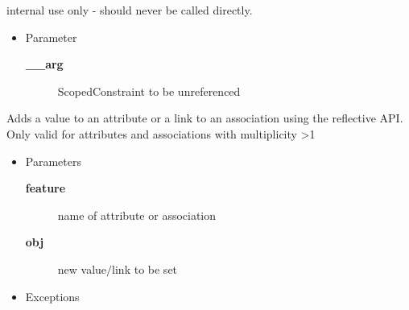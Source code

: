 \begin{desc}internal use only - should never be called directly.
\begin{itemize}
\item{Parameter
  \begin{description}
   \item[{\bf \_\_arg}]{ScopedConstraint to be unreferenced}
  \end{description}}
\end{itemize}
\end{desc}

\begin{desc}Adds a value to an attribute or a link to an association using the
 reflective API. Only valid for attributes and associations with
 multiplicity \textgreater  1
\begin{itemize}
\item{Parameters
  \begin{description}
   \item[{\bf feature}]{name of attribute or association}
   \item[{\bf obj}]{new value$/$link to be set}
  \end{description}}
\end{itemize}
\begin{itemize}
\item{{Exceptions}
}
\end{itemize}
\end{desc}

